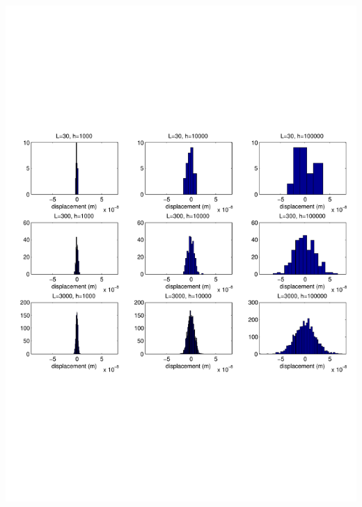 \documentclass[12pt]{article}
\begin{document}
\newpage\section{}

\includegraphics[width=\textwidth]{m/Ex4-no-gaussian.pdf} 
\end{document}
